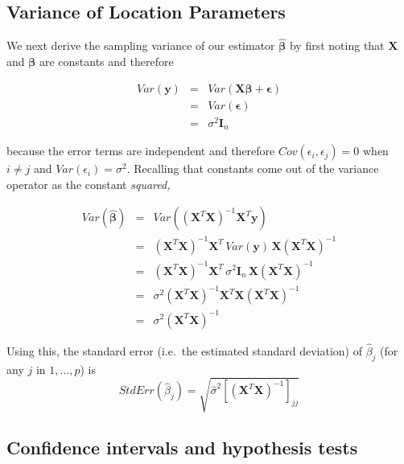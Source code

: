 \documentclass[]{book}
\theoremstyle{definition}
\theoremstyle{definition}
\theoremstyle{remark}
\begin{document}
\subsection{Variance of Location
Parameters}\label{variance-of-location-parameters}

We next derive the sampling variance of our estimator
\(\hat{\boldsymbol{\beta}}\) by first noting that \(\boldsymbol{X}\) and
\(\boldsymbol{\beta}\) are constants and therefore

\begin{eqnarray*}
Var\left(\boldsymbol{y}\right) & = & Var\left(\boldsymbol{X}\boldsymbol{\beta}+\boldsymbol{\epsilon}\right)\\
 & = & Var\left(\boldsymbol{\epsilon}\right)\\
 & = & \sigma^{2}\boldsymbol{I}_{n}
\end{eqnarray*}

because the error terms are independent and therefore
\(Cov\left(\epsilon_{i},\epsilon_{j}\right)=0\) when \(i\ne j\) and
\(Var\left(\epsilon_{i}\right)=\sigma^{2}\). Recalling that constants
come out of the variance operator as the constant \emph{squared,
}

\begin{eqnarray*}
Var\left(\hat{\boldsymbol{\beta}}\right) & = & Var\left(\left(\boldsymbol{X}^{T}\boldsymbol{X}\right)^{-1}\boldsymbol{X}^{T}\boldsymbol{y}\right)\\
 & = & \left(\boldsymbol{X}^{T}\boldsymbol{X}\right)^{-1}\boldsymbol{X}^{T}\,Var\left(\boldsymbol{y}\right)\,\boldsymbol{X}\left(\boldsymbol{X}^{T}\boldsymbol{X}\right)^{-1}\\
 & = & \left(\boldsymbol{X}^{T}\boldsymbol{X}\right)^{-1}\boldsymbol{X}^{T}\,\sigma^{2}\boldsymbol{I}_{n}\,\boldsymbol{X}\left(\boldsymbol{X}^{T}\boldsymbol{X}\right)^{-1}\\
 & = & \sigma^{2}\left(\boldsymbol{X}^{T}\boldsymbol{X}\right)^{-1}\boldsymbol{X}^{T}\boldsymbol{X}\left(\boldsymbol{X}^{T}\boldsymbol{X}\right)^{-1}\\
 & = & \sigma^{2}\left(\boldsymbol{X}^{T}\boldsymbol{X}\right)^{-1}
\end{eqnarray*}

Using this, the standard error (i.e.~the estimated standard deviation)
of \(\hat{\beta}_{j}\) (for any \(j\) in \(1,\dots,p\)) is \[
StdErr\left(\hat{\beta}_{j}\right)=\sqrt{\hat{\sigma}^{2}\left[\left(\boldsymbol{X}^{T}\boldsymbol{X}\right)^{-1}\right]_{jj}}
\]

\subsection{Confidence intervals and hypothesis
tests}\label{confidence-intervals-and-hypothesis-tests}
\end{document}
